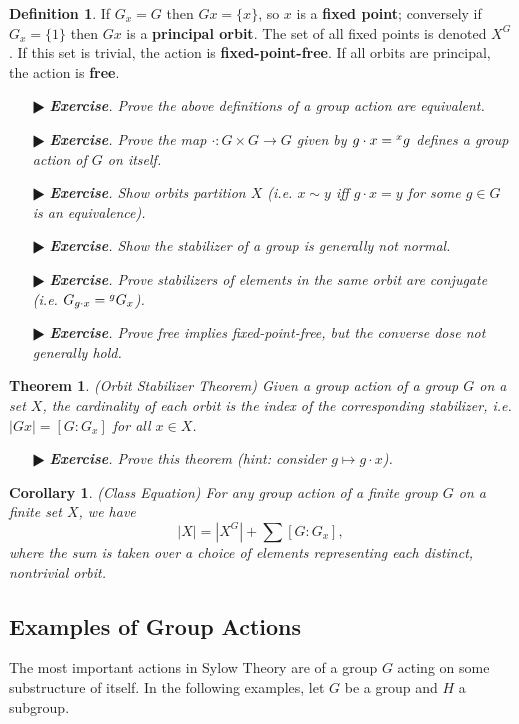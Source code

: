 \documentclass[11pt]{amsart}
\newtheorem*{theorem*}{Theorem}
\newtheorem*{corollary*}{Corollary}
\theoremstyle{definition}
\newtheorem*{definition*}{Definition}
\renewcommand\:{\colon}
\newcommand{\1}{\mathds{1}}
\newcommand{\exc}[1]{\vspace{-2.5pt}\begin{itemize}[leftmargin=15pt]\item[$\RHD$] \textit{\textbf{Exercise}. #1}\end{itemize}}
\begin{document}
\begin{definition*}
	If $G_x = G$ then $Gx = \{x\}$, so $x$ is a \textbf{fixed point}; conversely if $G_x = \{1\}$ then $Gx$ is a \textbf{principal orbit}. The set of all fixed points is denoted $X^G$. If this set is trivial, the action is \textbf{fixed-point-free}. If all orbits are principal, the action is \textbf{free}.
\end{definition*}

\exc{Prove the above definitions of a group action are equivalent.}
\exc{Prove the map $\cdot \: G \times G \to G$ given by $g \cdot x = \null^xg$ defines a group action of $G$ on itself.}
\exc{Show orbits partition $X$ (i.e. $x \sim y$ iff $g \cdot x = y$ for some $g \in G$ is an equivalence).}
\exc{Show the stabilizer of a group is generally not normal.}
\exc{Prove stabilizers of elements in the same orbit are conjugate \textnormal{(}i.e. $G_{g \cdot x} = \null^gG_x$\textnormal{)}.}
\exc{Prove free implies fixed-point-free, but the converse dose not generally hold.}

\begin{theorem*}
	\textnormal{(Orbit Stabilizer Theorem)} Given a group action of a group $G$ on a set  $X$, the cardinality of each orbit is the index of the corresponding stabilizer, i.e. $|Gx| = [G : G_x]$ for all $x \in X$.
\end{theorem*}

\exc{Prove this theorem \textnormal{(}hint: consider $g \mapsto g \cdot x$\textnormal{)}.}

\begin{corollary*}
	\textnormal{(Class Equation)} For any group action of a finite group $G$ on a finite set $X$, we have
		\[ |X| = |X^G| + \sum [G:G_x], \]
	where the sum is taken over a choice of elements representing each distinct, nontrivial orbit.
\end{corollary*}

\subsection*{Examples of Group Actions}

The most important actions in Sylow Theory are of a group $G$ acting on some substructure of itself. In the following examples, let $G$ be a group and $H$ a subgroup.
\end{document}
